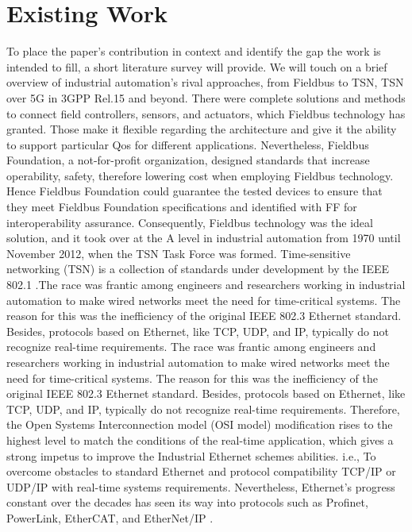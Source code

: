 \section{\textbf{Existing Work }}\label{sec:relatedwork}
To place the paper's contribution in context and identify the gap the work is intended to fill, a short literature survey will provide.
We will touch on a brief overview of industrial automation's rival approaches, from Fieldbus to TSN, TSN over 5G in 3GPP Rel.15 and beyond. There were complete solutions and methods to connect field controllers, sensors, and actuators, which Fieldbus technology has granted\cite{thomesse2005fieldbus}. Those make it flexible regarding the architecture and give it the ability to support particular Qos for different applications. Nevertheless, Fieldbus Foundation, a not-for-profit organization, designed standards that increase operability, safety, therefore lowering cost when employing Fieldbus technology. Hence Fieldbus Foundation could guarantee the tested devices to ensure that they meet Fieldbus Foundation specifications and identified with \textsurd FF  for interoperability assurance. Consequently, Fieldbus technology was the ideal solution, and it took over at the A level in industrial automation from 1970 until November 2012, when the TSN Task Force was formed\cite{shoshani2010industrial}.
Time-sensitive networking (TSN) is a collection of standards under development by the IEEE 802.1 \cite{TSN2019_study}.The race was frantic among engineers and researchers working in industrial automation to make wired networks meet the need for time-critical systems. The reason for this was the inefficiency of the original IEEE 802.3 Ethernet standard. Besides, protocols based on Ethernet, like TCP, UDP, and IP, typically do not recognize real-time requirements.
The race was frantic among engineers and researchers working in industrial automation to make wired networks meet the need for time-critical systems. The reason for this was the inefficiency of the original IEEE 802.3 Ethernet standard. Besides, protocols based on Ethernet, like TCP, UDP, and IP, typically do not recognize real-time requirements. Therefore, the Open Systems Interconnection model (OSI model) modification rises to the highest level to match the conditions of the real-time application, which gives a strong impetus to improve the Industrial Ethernet schemes abilities. i.e.,
To overcome obstacles to standard Ethernet and protocol compatibility TCP/IP or UDP/IP with real-time systems requirements\cite{danielis2014survey}. Nevertheless, Ethernet's progress constant over the decades has seen its way into protocols such as Profinet, PowerLink, EtherCAT, and EtherNet/IP \cite{thomesse2005fieldbus}.
  


